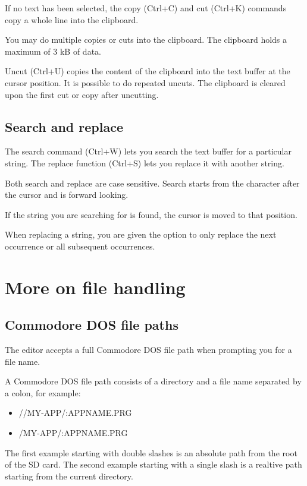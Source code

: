 \documentclass{article}
\begin{document}
        If no text has been selected, the copy (Ctrl+C) and cut (Ctrl+K) commands
        copy a whole line into the clipboard.

        You may do multiple copies or cuts into the clipboard. The clipboard holds a maximum of 3 kB of data.

        Uncut (Ctrl+U) copies the content of the clipboard into the text buffer at the cursor position. It is possible
        to do repeated uncuts. The clipboard is cleared upon the first cut or copy after uncutting.

    \subsection{Search and replace}
        The search command (Ctrl+W) lets you search the text buffer for
        a particular string. The replace function (Ctrl+S)
        lets you replace it with another string.

        Both search and replace are case sensitive. Search starts from the character after the cursor
        and is forward looking.

        If the string you are searching for is found, the cursor is moved to that position.

        When replacing a string, you are given the option to only replace the
        next occurrence or all subsequent occurrences.

\section{More on file handling}
    \subsection{Commodore DOS file paths}
    The editor accepts a full Commodore DOS file path when prompting you for a file name.

    A Commodore DOS file path consists of a directory and a file name separated by a colon, for
    example:

    \begin{itemize}
        \item //MY-APP/:APPNAME.PRG
        \item /MY-APP/:APPNAME.PRG
    \end{itemize}
    
    The first example starting with double slashes is an absolute path from the root of the SD card. The second
    example starting with a single slash is a realtive path starting from the current directory.
\end{document}
